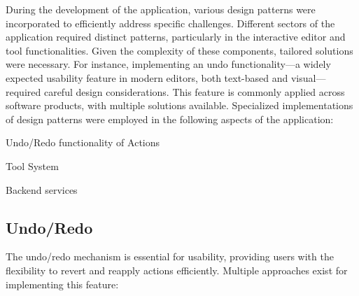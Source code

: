 During the development of the application, various design patterns were incorporated to efficiently address specific challenges. Different sectors of the application required distinct patterns, particularly in the interactive editor and tool functionalities. Given the complexity of these components, tailored solutions were necessary. For instance, implementing an undo functionality—a widely expected usability feature in modern editors, both text-based and visual—required careful design considerations. This feature is commonly applied across software products, with multiple solutions available. Specialized implementations of design patterns were employed in the following aspects of the application:
\begin{compactitem}
\item Undo/Redo functionality of Actions
\item Tool System
\item Backend services
\end{compactitem}

\subsection{Undo/Redo}
\label{sec:undo-redo}

The undo/redo mechanism is essential for usability, providing users with the flexibility to revert and reapply actions efficiently. Multiple approaches exist for implementing this feature:

